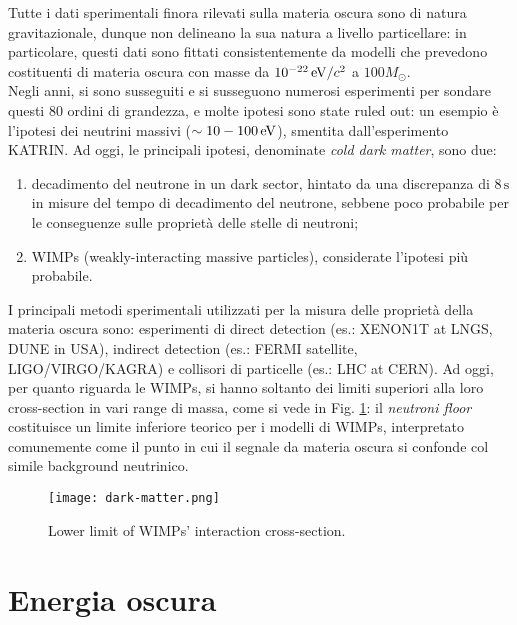 Tutte i dati sperimentali finora rilevati sulla materia oscura sono di natura gravitazionale, dunque non delineano la sua natura a livello particellare: in particolare, questi dati sono fittati consistentemente da modelli che prevedono costituenti di materia oscura con masse da $ 10^{-22} \,\mathrm{eV}/c^2 $ a $ 100 M_\odot $.\\
Negli anni, si sono susseguiti e si susseguono numerosi esperimenti per sondare questi 80 ordini di grandezza, e molte ipotesi sono state ruled out: un esempio è l'ipotesi dei neutrini massivi ($ \sim 10-100 \,\mathrm{eV} $), smentita dall'esperimento KATRIN. Ad oggi, le principali ipotesi, denominate \textit{cold dark matter}, sono due:
\begin{enumerate}
	\item decadimento del neutrone in un dark sector, hintato da una discrepanza di $ 8\,\text{s} $ in misure del tempo di decadimento del neutrone, sebbene poco probabile per le conseguenze sulle proprietà delle stelle di neutroni;
	\item WIMPs (weakly-interacting massive particles), considerate l'ipotesi più probabile.
\end{enumerate}
I principali metodi sperimentali utilizzati per la misura delle proprietà della materia oscura sono: esperimenti di direct detection (es.: XENON1T at LNGS, DUNE in USA), indirect detection (es.: FERMI satellite, LIGO/VIRGO/KAGRA) e collisori di particelle (es.: LHC at CERN). Ad oggi, per quanto riguarda le WIMPs, si hanno soltanto dei limiti superiori alla loro cross-section in vari range di massa, come si vede in Fig. \ref{dark-matter}: il \textit{neutroni floor} costituisce un limite inferiore teorico per i modelli di WIMPs, interpretato comunemente come il punto in cui il segnale da materia oscura si confonde col simile background neutrinico.

\begin{figure}
	\centering
	\texttt{[image: dark-matter.png]}
	\caption{Lower limit of WIMPs' interaction cross-section.}
	\label{dark-matter}
\end{figure}

\section{Energia oscura}

